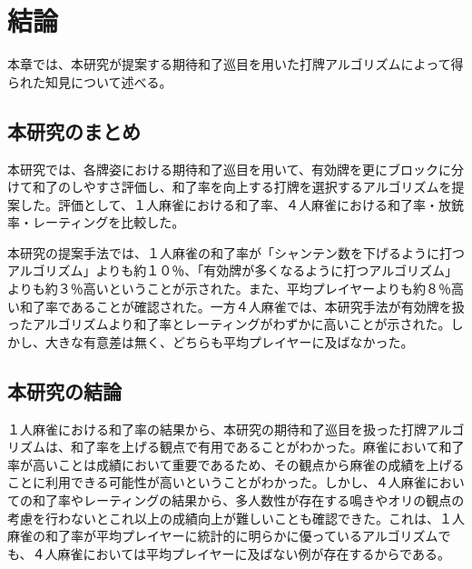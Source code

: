 \chapter{結論}
\label{chap:conclusion}

本章では、本研究が提案する期待和了巡目を用いた打牌アルゴリズムによって得られた知見について述べる。

\section{本研究のまとめ}
本研究では、各牌姿における期待和了巡目を用いて、有効牌を更にブロックに分けて和了のしやすさ評価し、和了率を向上する打牌を選択するアルゴリズムを提案した。評価として、１人麻雀における和了率、４人麻雀における和了率・放銃率・レーティングを比較した。

本研究の提案手法では、１人麻雀の和了率が「シャンテン数を下げるように打つアルゴリズム」よりも約１０％、「有効牌が多くなるように打つアルゴリズム」よりも約３％高いということが示された。また、平均プレイヤーよりも約８％高い和了率であることが確認された。一方４人麻雀では、本研究手法が有効牌を扱ったアルゴリズムより和了率とレーティングがわずかに高いことが示された。しかし、大きな有意差は無く、どちらも平均プレイヤーに及ばなかった。

\section{本研究の結論}
１人麻雀における和了率の結果から、本研究の期待和了巡目を扱った打牌アルゴリズムは、和了率を上げる観点で有用であることがわかった。麻雀において和了率が高いことは成績において重要であるため、その観点から麻雀の成績を上げることに利用できる可能性が高いということがわかった。しかし、４人麻雀においての和了率やレーティングの結果から、多人数性が存在する鳴きやオリの観点の考慮を行わないとこれ以上の成績向上が難しいことも確認できた。これは、１人麻雀の和了率が平均プレイヤーに統計的に明らかに優っているアルゴリズムでも、４人麻雀においては平均プレイヤーに及ばない例が存在するからである。

